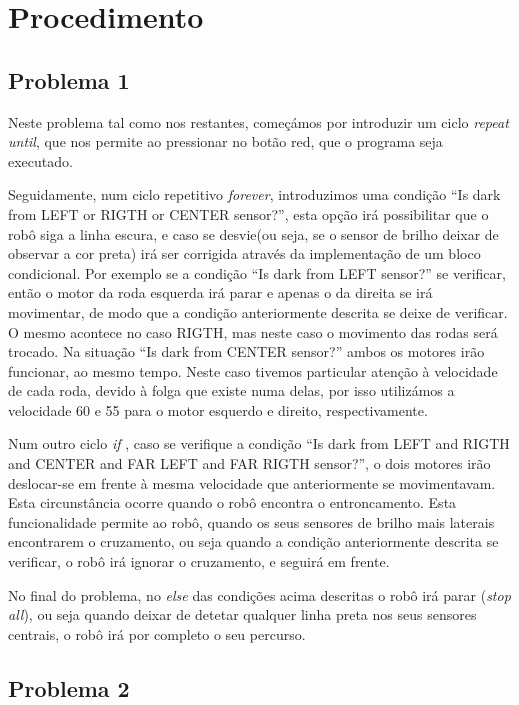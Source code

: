 \documentclass[a4paper, 12pt, onecolumn, oneside]{report}
\begin{document}
 \newpage
 
\section{Procedimento}

\subsection{Problema 1}

Neste problema tal como nos restantes, começámos por introduzir um ciclo \emph{repeat until}, que nos permite ao pressionar no botão red, que o programa seja executado.  

Seguidamente, num ciclo repetitivo \emph{forever}, introduzimos uma condição “Is dark from LEFT or RIGTH or CENTER sensor?”, esta opção irá possibilitar que o robô siga a linha escura, e caso se desvie(ou seja, se o sensor de brilho deixar de observar a cor preta) irá ser corrigida através da implementação de um bloco condicional. Por exemplo se a condição “Is dark from LEFT sensor?” se verificar, então o motor da roda esquerda irá parar e apenas o da direita se irá movimentar, de modo que a condição anteriormente descrita se deixe de verificar. O mesmo acontece no caso RIGTH, mas neste caso o movimento das rodas será trocado. Na situação “Is dark from CENTER sensor?” ambos os motores irão funcionar, ao mesmo tempo. Neste caso tivemos particular atenção à velocidade de cada roda, devido à folga que existe numa delas, por isso utilizámos a velocidade 60 e 55 para o motor esquerdo e direito, respectivamente. 

Num outro ciclo \emph{if} , caso se verifique a condição “Is dark from LEFT and RIGTH and CENTER and FAR LEFT and FAR RIGTH sensor?”, o dois motores irão deslocar-se em frente à mesma velocidade que anteriormente se movimentavam. Esta circunstância ocorre quando o robô encontra o entroncamento. Esta funcionalidade permite ao robô, quando os seus sensores de brilho mais laterais encontrarem o cruzamento, ou seja quando a condição anteriormente descrita se verificar, o robô irá ignorar o cruzamento, e seguirá em frente.  

No final do problema, no \emph{else} das condições acima descritas o robô irá parar (\emph{stop all}), ou seja quando deixar de detetar qualquer linha preta nos seus sensores centrais, o robô irá por completo o seu percurso.


\newpage

\subsection{Problema 2}
\end{document}
